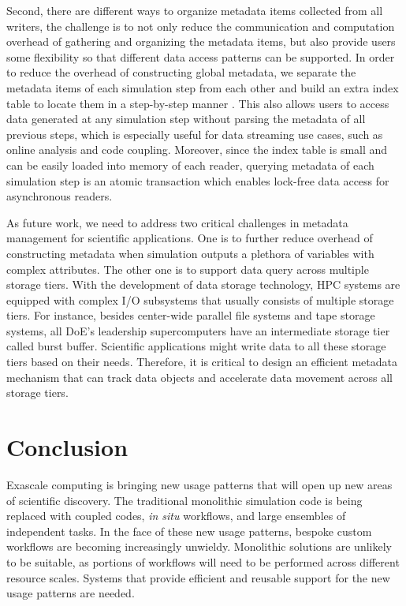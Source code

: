Second, there are different ways to organize metadata items collected from all writers, the challenge is to not only reduce the communication and computation overhead of gathering and organizing the metadata items, but also provide users some flexibility so that different data access patterns can be supported. In order to reduce the overhead of constructing global metadata, 
we separate the metadata items of each simulation step from each other and build an extra index table to locate them in a step-by-step manner \cite{Wan:2019}. This also allows users to access data generated at any simulation step without parsing the metadata of all previous steps, which is especially useful for data streaming use cases, such as online analysis and code coupling. Moreover, since the index table is small and can be easily loaded into memory of each reader, querying metadata of each simulation step is an atomic transaction which enables lock-free data access for asynchronous readers. 

As future work, we need to address two critical challenges in metadata management for scientific applications. One is to further reduce overhead of constructing metadata when simulation outputs a plethora of variables with complex attributes. The other one is to support data query across multiple storage tiers. With the development of data storage technology, HPC systems are equipped with complex I/O subsystems that usually consists of multiple storage tiers. For instance, besides center-wide parallel file systems and tape storage systems, all DoE's leadership supercomputers have an intermediate storage tier called burst buffer.
Scientific applications might write data to all these storage tiers based on their needs. Therefore, it is critical to design an efficient metadata mechanism that can track data objects and accelerate data movement across all storage tiers.


\section{Conclusion}

Exascale computing is bringing new usage patterns that will open up new areas of scientific discovery. The traditional monolithic simulation code is being replaced with coupled codes, \textit{in situ} workflows, and large ensembles of independent tasks. In the face of these new usage patterns, bespoke custom workflows are becoming increasingly unwieldy. Monolithic solutions are unlikely to be suitable, as portions of workflows will need to be performed across different resource scales. Systems that provide efficient and reusable support for the new usage patterns are needed.

